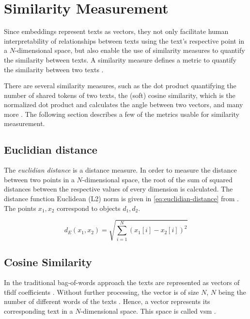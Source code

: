 
\section{Similarity Measurement}\label{sec:similarity-measurement}

Since embeddings represent texts as vectors, they not only facilitate human interpretability of relationships between texts using 
the text's respective point in a $N$-dimensional space, but also enable the use of similarity measures to quantify the similarity between texts.
A similarity measure defines a metric to quantify the similarity between two texts \cite{IR2011, euclidean_l2_norm2015}.

There are several similarity measures, such as the dot product quantifying the number of shared tokens of two texts, 
the (soft) cosine similarity, which is the normalized dot product and calculates the angle between two vectors, 
and many more \cite{IR2011, euclidean_l2_norm2015, HfsentTrans2019}.
The following section describes a few of the metrics usable for similarity measurement.


\subsection{Euclidian distance}\label{subsec:euclidian-distance}

The \textit{euclidian distance} is a distance measure.
In order to measure the distance between two points in a $N$-dimensional space, 
the root of the sum of squared distances between the respective values of every dimension is calculated.
The distance function Euclidean (L2) norm is given in \autoref{eq:euclidian-distance} from \cite{euclidean_l2_norm2015}.
The points $x_1, x_2$ correspond to objects $d_1, d_2$.

\begin{equation}
    d_E(x_1,x_2) = \sqrt{\sum_{i=1}^{N}(x_1\left[ i \right] - x_2\left[ i \right])^2}
    \label{eq:euclidian-distance}
\end{equation}


\subsection{Cosine Similarity}\label{subsec:cosine-similarity}

In the traditional bag-of-words approach the texts are represented as vectors of \ac{tfidf} coefficients \cite{soft_cosine2017}.
Without further processing, the vector is of size $N$, $N$ being the number of different words of the texts \cite{soft_cosine2017}.
Hence, a vector represents its corresponding text in a $N$-dimensional space.
This space is called \ac{vsm} \cite{soft_cosine2014}.

